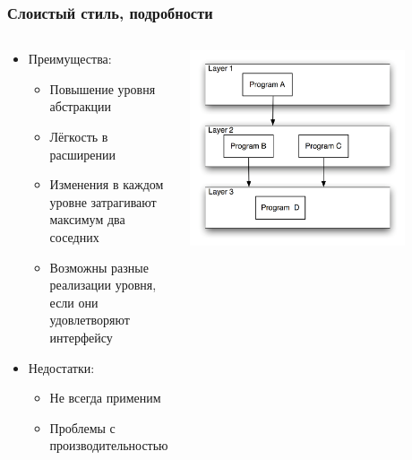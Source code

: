 \documentclass{../../slides-style}
\begin{document}
    \begin{frame}
        \frametitle{Слоистый стиль, подробности}
        \begin{columns}
            \begin{column}{0.5\textwidth}
                \begin{itemize}
                    \item Преимущества:
                    \begin{itemize}
                        \item Повышение уровня абстракции
                        \item Лёгкость в расширении
                        \item Изменения в каждом уровне затрагивают максимум два соседних
                        \item Возможны разные реализации уровня, если они удовлетворяют интерфейсу
                    \end{itemize}
                    \item Недостатки:
                    \begin{itemize}
                        \item Не всегда применим
                        \item Проблемы с производительностью
                    \end{itemize}
                \end{itemize}
            \end{column}
            \begin{column}{0.5\textwidth}
                \begin{center}
                    \includegraphics[width=0.8\textwidth]{layered.png}
                \end{center}
            \end{column}
        \end{columns}
    \end{frame}
\end{document}
